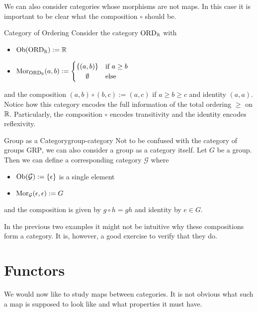 We can also consider categories whose morphisms are not maps. In this case it is important to be clear what the composition $\circ$ should be.

\begin{example}{Category of Ordering}{}
Consider the category $\mathrm{ORD}_\mathbb R$ with
\begin{itemize}
    \item $\mathrm {Ob}(\mathrm{ORD}_\mathbb R) := \mathbb R$
    \item $\mor_{\mathrm{ORD}_\R}(a,b) := \begin{cases}
        \{(a,b)\} & \text{if $a \ge b$} \\
        \hfil \emptyset & \text{else}
    \end{cases}$
\end{itemize}
and the composition $(a,b) \circ (b,c) := (a,c)$ if $a \ge b \ge c$ and identity $(a,a)$. Notice how this category encodes the full information of the total ordering $\ge$ on $\mathbb R$. Particularly, the composition $\circ$ encodes transitivity and the identity encodes reflexivity.
\end{example}

\begin{example}{Group as a Category}{group-category}
Not to be confused with the category of groups $\mathrm{GRP}$, we can also consider a group as a category itself.
Let $G$ be a group. Then we can define a corresponding category $\mathcal{G}$ where
\begin{itemize}
    \item $\mathrm {Ob}(\mathcal{G}) := \{\epsilon\}$ is a single element
    \item $\mathrm {Mor}_{\mathcal{G}}(\epsilon,\epsilon) := G$
\end{itemize}
and the composition is given by $g \circ h = gh$ and identity by $e \in G$.
\end{example}
In the previous two examples it might not be intuitive why these compositions form a category. It is, however, a good exercise to verify that they do.

\section{Functors}
We would now like to study maps between categories. 
It is not obvious what such a map is supposed to look like and what properties it must have.

